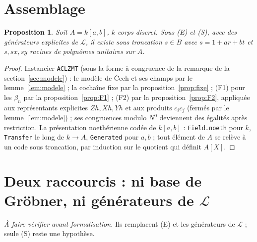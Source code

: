 \documentclass[11pt]{amsart}
\newtheorem{proposition}{Proposition}
\theoremstyle{remark}
\begin{document}
\section{Assemblage}

\begin{proposition}
Soit $A=k[a,b]$, $k$ corps discret. Sous (E) et (S), avec des générateurs
explicites de $\mathcal L$, il existe sous troncation $s\in B$ avec
$s=1+ar+bt$ et $s,sx,sy$ racines de polynômes unitaires sur $A$.
\end{proposition}
\begin{proof}
Instancier \texttt{ACLZMT} (sous la forme à congruence de la
remarque de la section~\ref{sec:modele}) : le modèle de Čech et ses
champs par le lemme~\ref{lem:modele} ; la cochaîne fixe par la
proposition~\ref{prop:fixe} ; (F1) pour les $\beta_n$ par la
proposition~\ref{prop:F1} ; (F2) par la proposition~\ref{prop:F2},
appliquée aux représentants explicites $Zh,Xh,Yh$ et aux produits
$c_ic_j$ (fermés par le lemme~\ref{lem:modele}) ; ses congruences modulo
$N^0$ deviennent des égalités après restriction. La présentation
noethérienne codée de $k[a,b]$ : \texttt{Field.noeth} pour $k$,
\texttt{Transfer} le long de $k\to A$, \texttt{Generated} pour $a,b$ ;
tout élément de $A$ se relève à un code sous troncation, par induction
sur le quotient qui définit $A[X]$.
\end{proof}


\section{Deux raccourcis : ni base de Gröbner, ni générateurs de $\mathcal L$}\label{sec:raccourcis}

\noindent\textit{À faire vérifier avant formalisation.} Ils remplacent (E)
et les générateurs de $\mathcal L$ ; seule (S) reste une hypothèse.
\end{document}
